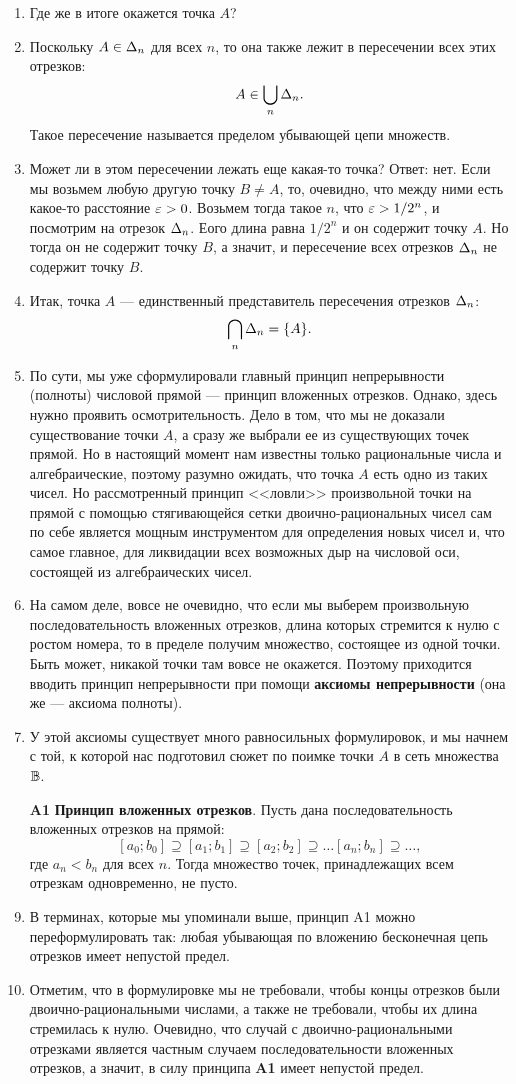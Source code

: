 \begin{enumerate}
\item Где же в итоге окажется точка $A$?
\item Поскольку $A\in\Delta_n$ для всех $n$, то она также лежит в пересечении всех этих отрезков:
$$
A\in\bigcup_n\Delta_n.
$$
Такое пересечение называется пределом убывающей цепи множеств.
\item Может ли в этом пересечении лежать еще какая-то точка? Ответ: нет. Если мы возьмем любую другую точку $B\ne A$, то, очевидно, что между ними есть какое-то расстояние $\varepsilon>0$. Возьмем тогда такое $n$, что $\varepsilon>1/2^n$, и посмотрим на отрезок $\Delta_n$. Еого длина равна $1/2^n$ и он содержит точку $A$. Но тогда он не содержит точку $B$, а значит, и пересечение всех отрезков $\Delta_n$ не содержит точку $B$.
\item Итак, точка $A$ --- единственный представитель пересечения отрезков $\Delta_n$:
$$
\bigcap_n\Delta_n = \{A\}.
$$
\item По сути, мы уже сформулировали главный принцип непрерывности (полноты) числовой прямой --- принцип вложенных отрезков. Однако, здесь нужно проявить осмотрительность. Дело в том, что мы не доказали существование точки $A$, а сразу же выбрали ее из существующих точек прямой. Но в настоящий момент нам известны только рациональные числа и алгебраические, поэтому разумно ожидать, что точка $A$ есть одно из таких чисел. Но рассмотренный принцип <<ловли>> произвольной точки на прямой с помощью стягивающейся сетки двоично-рациональных чисел сам по себе является мощным инструментом для определения новых чисел и, что самое главное, для ликвидации всех возможных дыр на числовой оси, состоящей из алгебраических чисел.
\item На самом деле, вовсе не очевидно, что если мы выберем произвольную последовательность вложенных отрезков, длина которых стремится к нулю с ростом номера, то в пределе получим множество, состоящее из одной точки. Быть может, никакой точки там вовсе не окажется. Поэтому приходится вводить принцип непрерывности при помощи \textbf{аксиомы непрерывности} (она же --- аксиома полноты).
\item У этой аксиомы существует много равносильных формулировок, и мы начнем с той, к которой нас подготовил сюжет по поимке точки $A$ в сеть множества $\mathbb B$.
\item[{\bf A1}] \textbf{Принцип вложенных отрезков}. Пусть дана последовательность вложенных отрезков на прямой:
$$
[a_0;b_0]\supseteq[a_1;b_1]\supseteq[a_2;b_2]\supseteq\dots[a_n;b_n]\supseteq\dots,
$$
где $a_n<b_n$ для всех $n$. Тогда множество точек, принадлежащих всем отрезкам одновременно, не пусто.
\item В терминах, которые мы упоминали выше, принцип A1 можно переформулировать так: любая убывающая по вложению бесконечная цепь отрезков имеет непустой предел.
\item Отметим, что в формулировке мы не требовали, чтобы концы отрезков были двоично-рациональными числами, а также не требовали, чтобы их длина стремилась к нулю. Очевидно, что случай с двоично-рациональными отрезками является частным случаем последовательности вложенных отрезков, а значит, в силу принципа \textbf{A1} имеет непустой предел.


\end{enumerate}
